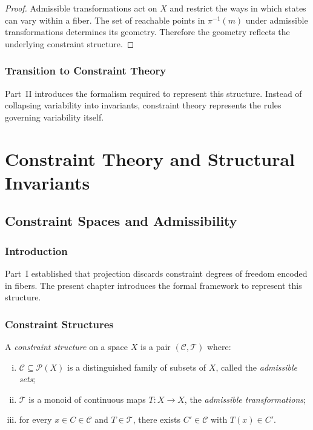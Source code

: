 \documentclass[11pt,openany]{book}
\begin{document}
\begin{proof}
Admissible transformations act on $X$ and restrict the ways
in which states can vary within a fiber. The set of
reachable points in $\pi^{-1}(m)$ under admissible
transformations determines its geometry. Therefore the
geometry reflects the underlying constraint structure.
\end{proof}

\section{Transition to Constraint Theory}
\label{sec:transition-constraint}

Part~II introduces the formalism required to represent this
structure. Instead of collapsing variability into
invariants, constraint theory represents the rules
governing variability itself.



\part{Constraint Theory and Structural Invariants}

\chapter{Constraint Spaces and Admissibility}
\label{ch:constraint-spaces}

\section{Introduction}
\label{sec:introduction-constraints}

Part~I established that projection discards constraint
degrees of freedom encoded in fibers. The present chapter
introduces the formal framework to represent this structure.

\section{Constraint Structures}
\label{sec:constraint-structures}

\begin{definition}
\label{def:constraint-structure-ch5}
A \emph{constraint structure} on a space $X$ is a pair
$(\mathcal{C}, \mathcal{T})$ where:
\begin{enumerate}[(i)]
  \item $\mathcal{C} \subseteq \mathcal{P}(X)$ is a
    distinguished family of subsets of $X$, called the
    \emph{admissible sets};
  \item $\mathcal{T}$ is a monoid of continuous maps
    $T : X \to X$, the \emph{admissible transformations};
  \item for every $x \in C \in \mathcal{C}$ and $T \in
    \mathcal{T}$, there exists $C' \in \mathcal{C}$ with
    $T(x) \in C'$.
\end{enumerate}
\end{definition}
\end{document}
